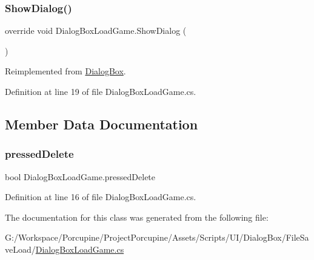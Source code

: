 \mbox{\label{class_dialog_box_load_game_af9b80f18655ef0ae924e49142fd12bf0}} 
\subsubsection{\texorpdfstring{Show\+Dialog()}{ShowDialog()}}
{\footnotesize\ttfamily override void Dialog\+Box\+Load\+Game.\+Show\+Dialog (\begin{DoxyParamCaption}{ }\end{DoxyParamCaption})\hspace{0.3cm}{\ttfamily [virtual]}}



Reimplemented from \hyperlink{class_dialog_box_a971a6e45f6ca26863c3910680521b0ac}{Dialog\+Box}.



Definition at line 19 of file Dialog\+Box\+Load\+Game.\+cs.



\subsection{Member Data Documentation}
\mbox{\label{class_dialog_box_load_game_a1bd968f6339acae37327e0228d147d7b}} 
\subsubsection{\texorpdfstring{pressed\+Delete}{pressedDelete}}
{\footnotesize\ttfamily bool Dialog\+Box\+Load\+Game.\+pressed\+Delete}



Definition at line 16 of file Dialog\+Box\+Load\+Game.\+cs.



The documentation for this class was generated from the following file\+:\begin{DoxyCompactItemize}
\item 
G\+:/\+Workspace/\+Porcupine/\+Project\+Porcupine/\+Assets/\+Scripts/\+U\+I/\+Dialog\+Box/\+File\+Save\+Load/\hyperlink{_dialog_box_load_game_8cs}{Dialog\+Box\+Load\+Game.\+cs}\end{DoxyCompactItemize}
